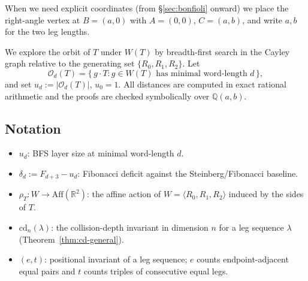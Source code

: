 \documentclass[11pt,a4paper]{article}
\theoremstyle{remark}
\theoremstyle{plain}
\begin{document}
When we need explicit coordinates (from §\ref{sec:bonfioli} onward) we
place the right-angle vertex at $B = (a, 0)$ with $A = (0, 0)$,
$C = (a, b)$, and write $a, b$ for the two leg lengths.

We explore the orbit of $T$ under $W(T)$ by breadth-first search in the
Cayley graph relative to the generating set $\{R_0, R_1, R_2\}$.  Let
\[
\mathcal{O}_d(T) = \bigl\{\, g \cdot T : g \in W(T) \text{ has minimal
word-length } d \,\bigr\},
\]
and set $u_d := |\mathcal{O}_d(T)|$, $u_0 = 1$.
All distances are computed in exact rational arithmetic and the proofs
are checked symbolically over $\mathbb{Q}(a, b)$.

\subsection{Notation}
\label{ssec:notation}

\begin{itemize}[leftmargin=*,itemsep=0.1em]
\item $u_d$: BFS layer size at minimal word-length $d$.
\item $\delta_d := F_{d+3} - u_d$: Fibonacci deficit against the Steinberg/Fibonacci baseline.
\item $\rho_T : W \to \mathrm{Aff}(\mathbb{R}^2)$: the affine action of
$W = \langle R_0, R_1, R_2 \rangle$ induced by the sides of $T$.
\item $\mathrm{cd}_n(\lambda)$: the collision-depth invariant in
dimension $n$ for a leg sequence $\lambda$ (Theorem~\ref{thm:cd-general}).
\item $(e, t)$: positional invariant of a leg sequence; $e$ counts
endpoint-adjacent equal pairs and $t$ counts triples of consecutive
equal legs.
\end{itemize}
\end{document}
